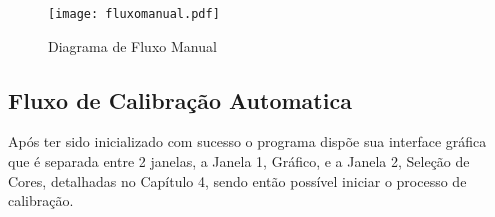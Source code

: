 		\begin{figure}[!h]
				\centering
				\texttt{[image: fluxomanual.pdf]}
				\caption{Diagrama de Fluxo Manual}
				\label{DiagramaDeFluxoManual}
			\end{figure}
	\subsection{Fluxo de Calibração Automatica}		
		Após ter sido inicializado com sucesso o programa dispõe sua interface gráfica que é separada entre 2 janelas, a Janela 1, Gráfico, e a Janela 2, Seleção de Cores, detalhadas no Capítulo 4, sendo então possível iniciar o processo de calibração. 
